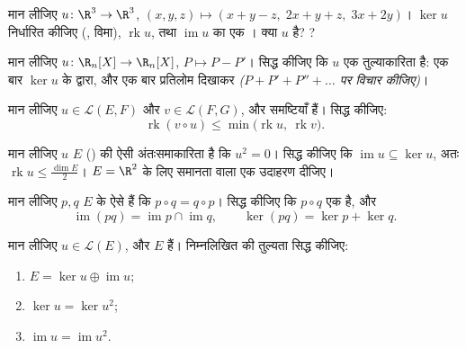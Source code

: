 \begin{exercise}[$\star$]\label{exo:b1:linmaps:2}
मान लीजिए $u \colon \R^3 \to \R^3$, $(x,y,z) \mapsto (x + y - z,\; 2x + y +
z,\; 3x + 2y)$। $\ker u$ निर्धारित कीजिए (, विमा), $\operatorname{rk}
u$, तथा $\operatorname{im} u$ का एक । क्या $u$  है? ?
\end{exercise}

\begin{exercise}[$\star$]\label{exo:b1:linmaps:3}
मान लीजिए $u \colon \R_n[X] \to \R_n[X]$, $P \mapsto P - P'$। सिद्ध कीजिए कि
$u$ एक तुल्याकारिता है: एक बार $\ker u$ के द्वारा, और एक बार प्रतिलोम दिखाकर
\emph{($P + P' + P'' + \dots$ पर विचार कीजिए)}।
\end{exercise}

\begin{exercise}[$\star$]\label{exo:b1:linmaps:4}
मान लीजिए $u \in \mathcal{L}(E, F)$ और $v \in \mathcal{L}(F, G)$, और
समष्टियाँ  हैं। सिद्ध कीजिए:
\[
\operatorname{rk}(v \circ u) \leq
\min\bigl(\operatorname{rk} u,\ \operatorname{rk} v\bigr).
\]
\end{exercise}

\begin{exercise}[$\star\star$]\label{exo:b1:linmaps:5}
मान लीजिए $u$ $E$ () की ऐसी अंतःसमाकारिता है कि $u^2 = 0$। सिद्ध
कीजिए कि $\operatorname{im} u \subseteq \ker u$, अतः $\operatorname{rk} u
\leq \frac{\dim E}{2}$। $E = \R^2$ के लिए समानता वाला एक उदाहरण दीजिए।
\end{exercise}

\begin{exercise}[$\star\star$]\label{exo:b1:linmaps:6}
मान लीजिए $p, q$ $E$ के ऐसे  हैं कि $p \circ q = q \circ p$। सिद्ध
कीजिए कि $p \circ q$ एक  है, और
\[
\operatorname{im}(pq) = \operatorname{im} p \cap \operatorname{im}
q ,
\qquad
\ker (pq) = \ker p + \ker q .
\]
\end{exercise}

\begin{exercise}[$\star\star$]\label{exo:b1:linmaps:7}
मान लीजिए $u \in \mathcal{L}(E)$, और $E$  हैं। निम्नलिखित की
तुल्यता सिद्ध कीजिए:
\begin{enumerate}
  \item $E = \ker u \oplus \operatorname{im} u$;
  \item $\ker u = \ker u^2$;
  \item $\operatorname{im} u = \operatorname{im} u^2$.
\end{enumerate}
\end{exercise}


